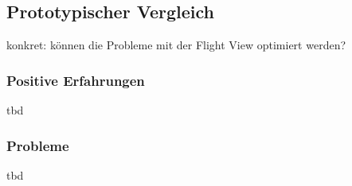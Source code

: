 \subsection{Prototypischer Vergleich}
konkret: können die Probleme mit der Flight View optimiert werden?

\subsubsection{Positive Erfahrungen}
tbd

\subsubsection{Probleme}
tbd
